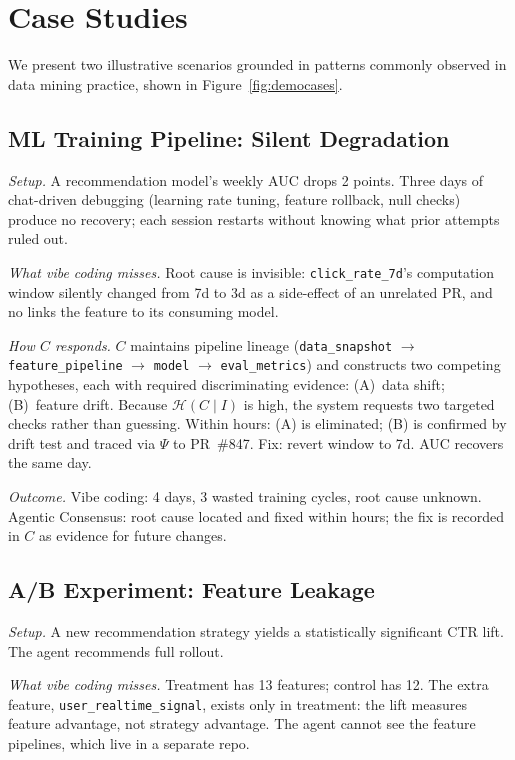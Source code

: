 
\section{Case Studies}
We present two illustrative scenarios grounded in patterns commonly observed in data mining practice, shown in Figure~\ref{fig:democases}.

\subsection{ML Training Pipeline: Silent Degradation}

\textit{Setup.} A recommendation model's weekly AUC drops 2 points.
Three days of chat-driven debugging (learning rate tuning, feature rollback, null checks) produce no recovery; each session restarts without knowing what prior attempts ruled out.

\textit{What vibe coding misses.} Root cause is invisible: \texttt{click\_rate\_7d}'s computation window silently changed from 7d to 3d as a side-effect of an unrelated PR, and no links the feature to its consuming model.

\textit{How $C$ responds.} $C$ maintains pipeline lineage (\texttt{data\_snapshot} $\to$ \texttt{feature\_pipeline} $\to$ \texttt{model} $\to$ \texttt{eval\_metrics}) and constructs two competing hypotheses, each with required discriminating evidence: (A)~data shift; (B)~feature drift.
Because $\mathcal{H}(C \mid I)$ is high, the system requests two targeted checks rather than guessing.
Within hours: (A) is eliminated; (B) is confirmed by drift test and traced via $\Psi$ to PR~\#847.
Fix: revert window to 7d. AUC recovers the same day.

\textit{Outcome.} Vibe coding: 4 days, 3 wasted training cycles, root cause unknown.
Agentic Consensus: root cause located and fixed within hours; the fix is recorded in $C$ as evidence for future changes.

\subsection{A/B Experiment: Feature Leakage}

\textit{Setup.} A new recommendation strategy yields a statistically significant CTR lift.
The agent recommends full rollout.

\textit{What vibe coding misses.} Treatment has 13 features; control has 12. The extra feature, \texttt{user\_realtime\_signal}, exists only in treatment: the lift measures feature advantage, not strategy advantage. The agent cannot see the feature pipelines, which live in a separate repo.

